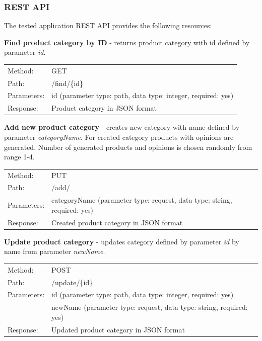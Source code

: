 \documentclass[12pt,a4paper]{article}
\begin{document}
\subsubsection{REST API} 
The tested application REST API provides the following resources:
\vspace{3mm}

\noindent\textbf{Find product category by ID} - returns product category with id defined by parameter \textit{id}.

{\renewcommand{\arraystretch}{1}
  \begin{tabular}{ll}
  Method: & GET\\
  Path: & /find/\{id\}\\
  Parameters: & id (parameter type: path, data type: integer, required: yes)\\
  Response: & Product category in JSON format \\
  \end{tabular} \vspace{5mm}
}

\noindent\textbf{Add new product category} - creates new category with name defined by parameter \textit{categoryName}. For created category products with opinions are generated. Number of generated products and opinions is chosen randomly from range 1-4. 

{\renewcommand{\arraystretch}{1}
  \begin{tabular}{ll}
  Method: & PUT \\
  Path: & /add/ \\
  Parameters: & categoryName (parameter type: request, data type: string, required: yes)\\
  Response: & Created product category in JSON format  \\
  \end{tabular} \vspace{5mm}
}

\noindent\textbf{Update product category} - updates category defined by parameter \textit{id} by name from parameter \textit{newName}. 

{\renewcommand{\arraystretch}{1}
  \begin{tabular}{ll}
  Method: & POST \\
  Path: & /update/\{id\} \\
  Parameters: & id (parameter type: path, data type: integer, required: yes)\\
              & newName (parameter type: request, data type: string, required: yes)\\
  Response: & Updated product category in JSON format  \\
  \end{tabular} \vspace{5mm}
}
\end{document}
